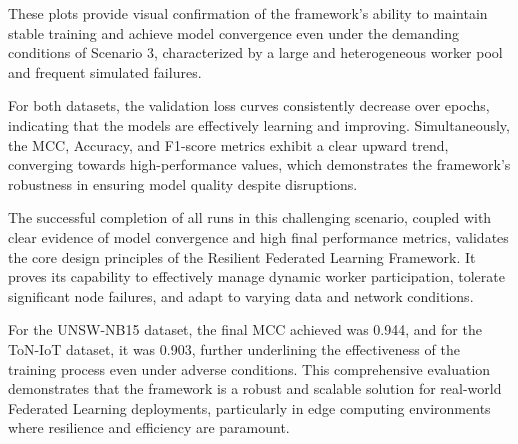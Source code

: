 These plots provide visual confirmation of the framework's ability to maintain stable training and achieve model convergence even under the demanding conditions of Scenario 3, characterized by a large and heterogeneous worker pool and frequent simulated failures. 

For both datasets, the validation loss curves consistently decrease over epochs, indicating that the models are effectively learning and improving. Simultaneously, the MCC, Accuracy, and F1-score metrics exhibit a clear upward trend, converging towards high-performance values, which demonstrates the framework's robustness in ensuring model quality despite disruptions.

The successful completion of all runs in this challenging scenario, coupled with clear evidence of model convergence and high final performance metrics, validates the core design principles of the Resilient Federated Learning Framework. It proves its capability to effectively manage dynamic worker participation, tolerate significant node failures, and adapt to varying data and network conditions. 

For the UNSW-NB15 dataset, the final MCC achieved was 0.944, and for the ToN-IoT dataset, it was 0.903, further underlining the effectiveness of the training process even under adverse conditions. This comprehensive evaluation demonstrates that the framework is a robust and scalable solution for real-world Federated Learning deployments, particularly in edge computing environments where resilience and efficiency are paramount.
